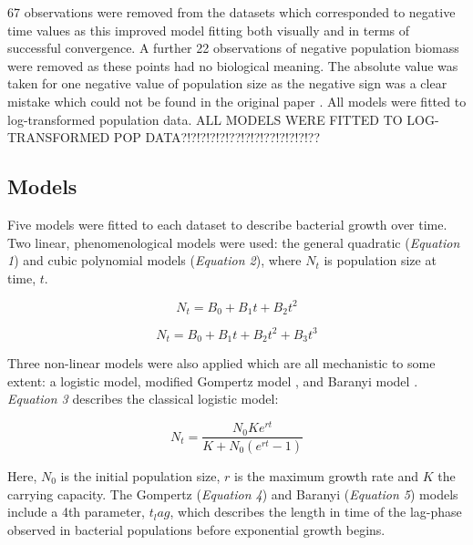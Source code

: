 \documentclass[11pt]{article}
\begin{document}
\begin{linenumbers}
            67 observations were removed from the datasets which corresponded to negative time values as this improved model fitting both visually and in terms of successful convergence. A further 22 observations of negative population biomass were removed as these points had no biological meaning. The absolute value was taken for one negative value of population size as the negative sign was a clear mistake which could not be found in the original paper \citep{bernhardt_metabolic_2018}. All models were fitted to log-transformed population data. ALL MODELS WERE FITTED TO LOG-TRANSFORMED POP DATA?!?!?!?!?!??!?!?!??!?!?!?!??


        \subsection{Models}
        
            Five models were fitted to each dataset to describe bacterial growth over time. Two linear, phenomenological models were used: the general quadratic (\emph{Equation 1}) and cubic polynomial models (\emph{Equation 2}), where $N_t$ is population size at time, $t$. 
            
            \begin{equation}
                N_t = B_0 + B_1 t + B_2 t^2
            \end{equation}
            
            \begin{equation}
                N_t = B_0 + B_1 t + B_2 t^2 + B_3 t^3
            \end{equation}
            
            Three non-linear models were also applied which are all mechanistic to some extent: a logistic model, modified Gompertz model \citep{zwietering_modeling_1990}, and Baranyi model \citep{baranyi_dynamic_1994, grijspeerdt_estimating_1999}. \emph{Equation 3} describes the classical logistic model:
            
            \begin{equation}
                N_t = \frac{N_0 K e^{rt}}{K + N_0 (e^{rt} - 1)}
            \end{equation}
            
            Here, $N_0$ is the initial population size, $r$ is the maximum growth rate and $K$ the carrying capacity. The Gompertz (\emph{Equation 4}) and Baranyi (\emph{Equation 5}) models include a 4th parameter, $t_lag$, which describes the length in time of the lag-phase observed in bacterial populations before exponential growth begins.
            

\end{linenumbers}
\end{document}
